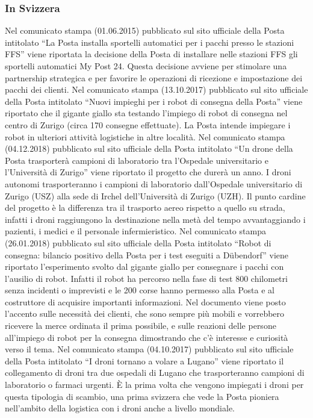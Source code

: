 \subsubsection{In Svizzera}
Nel comunicato stampa (01.06.2015) pubblicato sul sito ufficiale della Posta intitolato “La Posta installa sportelli automatici per i pacchi presso le stazioni FFS” viene riportata la decisione della Posta di installare nelle stazioni FFS gli sportelli automatici My Post 24. Questa decisione avviene per stimolare una partnership strategica e per favorire le operazioni di ricezione e impostazione dei pacchi dei clienti. 
Nel comunicato stampa (13.10.2017) pubblicato sul sito ufficiale della Posta intitolato “Nuovi impieghi per i robot di consegna della Posta” viene riportato che il gigante giallo sta testando l’impiego di robot di consegna nel centro di Zurigo (circa 170 consegne effettuate). La Posta intende impiegare i robot in ulteriori attività logistiche in altre località. 
Nel comunicato stampa (04.12.2018) pubblicato sul sito ufficiale della Posta intitolato “Un drone della Posta trasporterà campioni di laboratorio tra l’Ospedale universitario e l’Università di Zurigo” viene riportato il progetto che durerà un anno. I droni autonomi trasporteranno i campioni di laboratorio dall’Ospedale universitario di Zurigo (USZ) alla sede di Irchel dell’Università di Zurigo (UZH). Il punto cardine del progetto è la differenza tra il trasporto aereo rispetto a quello su strada, infatti i droni raggiungono la destinazione nella metà del tempo avvantaggiando i pazienti, i medici e il personale infermieristico. 
Nel comunicato stampa (26.01.2018) pubblicato sul sito ufficiale della Posta intitolato “Robot di consegna: bilancio positivo della Posta per i test eseguiti a Dübendorf” viene riportato l’esperimento svolto dal gigante giallo per consegnare i pacchi con l’ausilio di robot. Infatti il robot ha percorso nella fase di test 800 chilometri senza incidenti o imprevisti e le 200 corse hanno permesso alla Posta e al costruttore di acquisire importanti informazioni. Nel documento viene posto l’accento sulle necessità dei clienti, che sono sempre più mobili e vorrebbero ricevere la merce ordinata il prima possibile, e sulle reazioni delle persone all’impiego di robot per la consegna dimostrando che c’è interesse e curiosità verso il tema. 
Nel comunicato stampa (04.10.2017) pubblicato sul sito ufficiale della Posta intitolato “I droni tornano a volare a Lugano” viene riportato il collegamento di droni tra due ospedali di Lugano che trasporteranno campioni di laboratorio o farmaci urgenti.  È la prima volta che vengono impiegati i droni per questa tipologia di scambio, una prima svizzera che vede la Posta pioniera nell’ambito della logistica con i droni anche a livello mondiale. 
